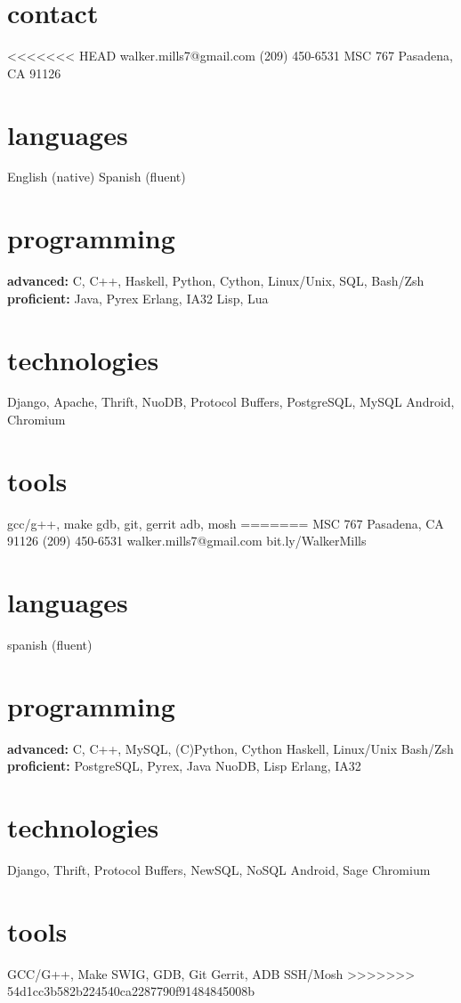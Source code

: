 \documentclass[]{mills-cv} %
\begin{document}


\begin{aside} %
\section{contact}
<<<<<<< HEAD
\small walker.mills7@gmail.com
(209) 450-6531
MSC 767
Pasadena, CA 91126
\section{languages}
English (native)
Spanish (fluent)
\section{programming}
\textbf{advanced:}
C, C++, Haskell,
Python, Cython, 
Linux/Unix, SQL,
Bash/Zsh
\textbf{proficient:}
Java, Pyrex
Erlang, IA32
Lisp, Lua
\section{technologies}
Django, Apache,
Thrift, NuoDB,
Protocol Buffers,
PostgreSQL, MySQL
Android, Chromium
\section{tools}
gcc/g++, make
gdb, git, gerrit
adb, mosh
=======
MSC 767
Pasadena, CA 91126
(209) 450-6531
\small walker.mills7@gmail.com
bit.ly/WalkerMills
\section{languages}
spanish (fluent)
\section{programming}
\textbf{advanced:}
C, C++, MySQL,
(C)Python, Cython
Haskell, Linux/Unix
Bash/Zsh
\textbf{proficient:}
PostgreSQL,
Pyrex, Java
NuoDB, Lisp
Erlang, IA32
\section{technologies}
Django, Thrift,
Protocol Buffers,
NewSQL, NoSQL
Android, Sage
Chromium
\section{tools}
GCC/G++, Make
SWIG, GDB, Git
Gerrit, ADB
SSH/Mosh
>>>>>>> 54d1cc3b582b224540ca2287790f91484845008b
\end{aside}
\end{document}
